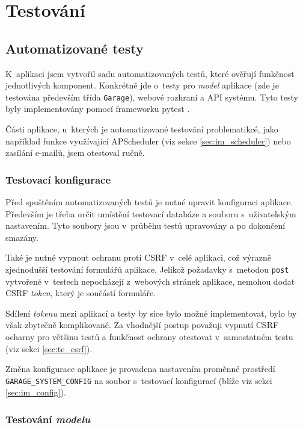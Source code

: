\chapter{Testování}
\label{sec:te}

\section{Automatizované testy}

K~aplikaci jsem vytvořil sadu automatizovaných testů, které ověřují funkčnost jednotlivých komponent. Konkrétně jde o~testy pro \textit{model} aplikace (zde je testována především třída \texttt{Garage}), webové rozhraní a API systému. Tyto testy byly implementovány pomocí frameworku pytest \cite{pytest}.

Části aplikace, u~kterých je automatizované testování problematikcé, jako například funkce využívající APScheduler (viz sekce \ref{sec:im_scheduler}) nebo zasílání e-mailů, jsem otestoval ručně.

\subsection{Testovací konfigurace}

Před spuštěním automatizovaných testů je nutné upravit konfiguraci aplikace. Především je třeba určit umístění testovací databáze a souboru s~uživatelským nastavením. Tyto soubory jsou v~průběhu testů upravovány a po dokončení smazány.

Také je nutné vypnout ochranu proti CSRF v~celé aplikaci, což výrazně zjednodušší testování formulářů aplikace. Jelikož požadavky s~metodou \texttt{post} vytvořené v~testech nepocházejí z~webových stránek aplikace, nemohou dodat CSRF \textit{token}, který je součástí formuláře. 

Sdílení \textit{tokenu} mezi aplikací a testy by sice bylo možné implementovat, bylo by však zbytečně komplikované. Za vhodnější postup považuji vypnutí CSRF ocharny pro většinu testů a funkčnost ochrany otestovat v~samostatném testu (viz sekci \ref{sec:te_csrf}).

Změna konfigurace aplikace je provadena nastavením proměnné prostředí \texttt{GARAGE\_SYSTEM\_CONFIG} na soubor s~testovací konfigurací (blíže viz sekci \ref{sec:im_config}).

\subsection{Testování \textit{modelu}}
\label{sec:te_model}

